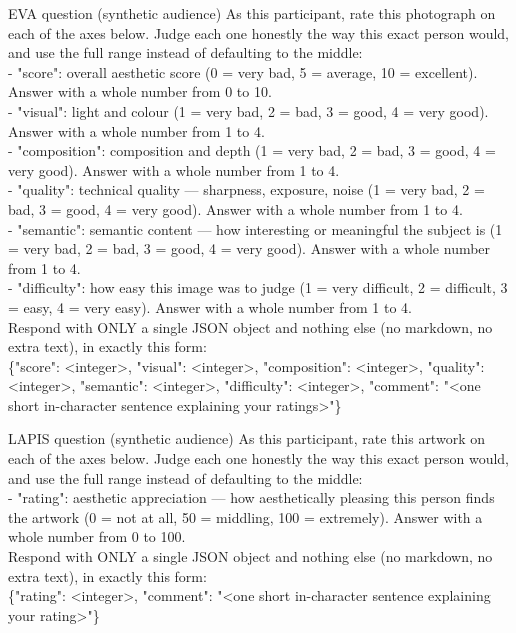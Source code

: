 \documentclass[runningheads]{llncs}
\begin{document}
\begin{promptbox}{EVA question (synthetic audience)}
\ttfamily
As this participant, rate this photograph on each of the axes below. Judge each one honestly the way this exact person would, and use the full range instead of defaulting to the middle:\\
- "score": overall aesthetic score (0 = very bad, 5 = average, 10 = excellent). Answer with a whole number from 0 to 10.\\
- "visual": light and colour (1 = very bad, 2 = bad, 3 = good, 4 = very good). Answer with a whole number from 1 to 4.\\
- "composition": composition and depth (1 = very bad, 2 = bad, 3 = good, 4 = very good). Answer with a whole number from 1 to 4.\\
- "quality": technical quality — sharpness, exposure, noise (1 = very bad, 2 = bad, 3 = good, 4 = very good). Answer with a whole number from 1 to 4.\\
- "semantic": semantic content — how interesting or meaningful the subject is (1 = very bad, 2 = bad, 3 = good, 4 = very good). Answer with a whole number from 1 to 4.\\
- "difficulty": how easy this image was to judge (1 = very difficult, 2 = difficult, 3 = easy, 4 = very easy). Answer with a whole number from 1 to 4.\\[2pt]
Respond with ONLY a single JSON object and nothing else (no markdown, no extra text), in exactly this form:\\
\{"score": <integer>, "visual": <integer>, "composition": <integer>, "quality": <integer>, "semantic": <integer>, "difficulty": <integer>, "comment": "<one short in-character sentence explaining your ratings>"\}
\end{promptbox}
\begin{promptbox}{LAPIS question (synthetic audience)}
\ttfamily
As this participant, rate this artwork on each of the axes below. Judge each one honestly the way this exact person would, and use the full range instead of defaulting to the middle:\\
- "rating": aesthetic appreciation — how aesthetically pleasing this person finds the artwork (0 = not at all, 50 = middling, 100 = extremely). Answer with a whole number from 0 to 100.\\[2pt]
Respond with ONLY a single JSON object and nothing else (no markdown, no extra text), in exactly this form:\\
\{"rating": <integer>, "comment": "<one short in-character sentence explaining your rating>"\}
\end{promptbox}
\end{document}
